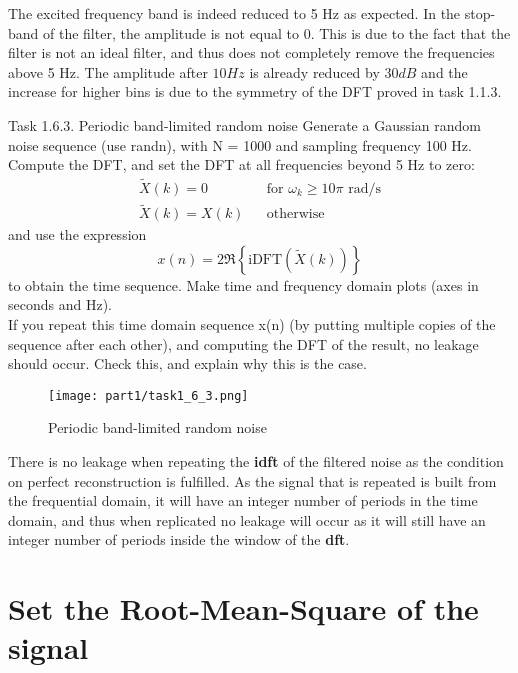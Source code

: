 The excited frequency band is indeed reduced to 5 Hz as expected. In the stop-band of the filter, the amplitude is not equal to 0. This is due to the fact that the filter is not an ideal filter, and thus does not completely remove the frequencies above 5 Hz. The amplitude after $10 Hz$ is already reduced by $30 dB$ and the increase for higher bins is due to the symmetry of the DFT proved in task 1.1.3.

\begin{Task}{Task 1.6.3. Periodic band-limited random noise}
    Generate a Gaussian random noise sequence (use randn), with N = 1000 and sampling frequency 100 Hz. Compute the DFT, and set the DFT at all frequencies beyond 5 Hz to zero:
    \begin{align*}
        \tilde{X}(k) = 0 && \text{for } \omega_k \geq 10\pi \text{ rad/s}\\
        \tilde{X}(k) = X(k) && \text{otherwise}
    \end{align*}
    and use the expression
    \begin{equation*}
        x(n) = 2 \Re \left\{\text{iDFT}(\tilde{X}(k))\right\}
    \end{equation*}
    to obtain the time sequence. Make time and frequency domain plots (axes in seconds and Hz).\\
    If you repeat this time domain sequence x(n) (by putting multiple copies of the sequence after each other), and computing the DFT of the result, no leakage should occur. Check this, and explain why this is the case.
\end{Task}

\begin{figure}[H]
    \centering
    \texttt{[image: part1/task1\_6\_3.png]}
    \caption{Periodic band-limited random noise}
\end{figure}

There is no leakage when repeating the \textbf{idft} of the filtered noise as the condition on perfect reconstruction is fulfilled. As the signal that is repeated is built from the frequential domain, it will have an integer number of periods in the time domain, and thus when replicated no leakage will occur as it will still have an integer number of periods inside the window of the \textbf{dft}.

\section{Set the Root-Mean-Square of the signal}

